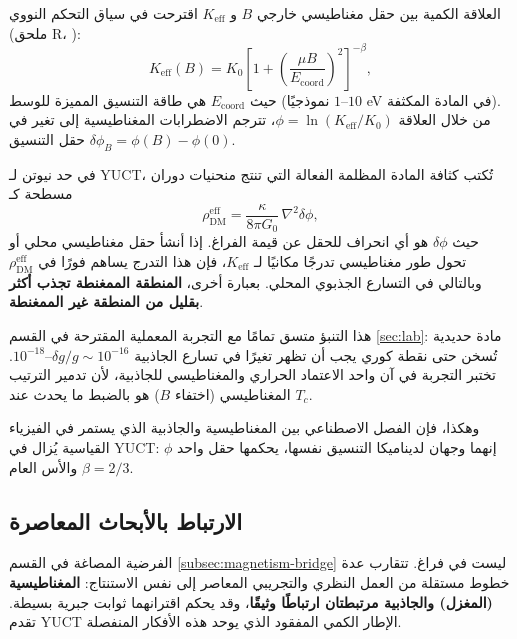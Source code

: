 \documentclass[11pt,a4paper]{article}
\newcommand{\Keff}{K_{\mathrm{eff}}}
\begin{document}
	العلاقة الكمية بين حقل مغناطيسي خارجي $B$ و $\Keff$ اقترحت في سياق التحكم النووي (ملحق R، \cite{AppendixR}):
	\begin{equation}
		\Keff(B) = K_0 \left[ 1 + \left( \frac{\mu B}{E_{\mathrm{coord}}} \right)^2 \right]^{-\beta},
		\label{eq:keff-B}
	\end{equation}
	حيث $E_{\mathrm{coord}}$ هي طاقة التنسيق المميزة للوسط (نموذجيًا $1$--$10$ eV في المادة المكثفة). من خلال العلاقة $\phi = \ln(\Keff/K_0)$، تترجم الاضطرابات المغناطيسية إلى تغير في حقل التنسيق $\delta\phi_B = \phi(B) - \phi(0)$.
	
	في حد نيوتن لـ YUCT، تُكتب كثافة المادة المظلمة الفعالة التي تنتج منحنيات دوران مسطحة كـ
	\begin{equation}
		\rho_{\mathrm{DM}}^{\mathrm{eff}} = \frac{\kappa}{8\pi G_0}\,\nabla^2\delta\phi,
		\label{eq:rho-dm}
	\end{equation}
	حيث $\delta\phi$ هو أي انحراف للحقل عن قيمة الفراغ. إذا أنشأ حقل مغناطيسي محلي أو تحول طور مغناطيسي تدرجًا مكانيًا لـ $\Keff$، فإن هذا التدرج يساهم فورًا في $\rho_{\mathrm{DM}}^{\mathrm{eff}}$ وبالتالي في التسارع الجذبوي المحلي. بعبارة أخرى، \textbf{المنطقة الممغنطة تجذب أكثر بقليل من المنطقة غير الممغنطة}.
	
	هذا التنبؤ متسق تمامًا مع التجربة المعملية المقترحة في القسم \ref{sec:lab}: مادة حديدية تُسخن حتى نقطة كوري يجب أن تظهر تغيرًا في تسارع الجاذبية $\delta g/g \sim 10^{-16}$–$10^{-18}$. تختبر التجربة في آن واحد الاعتماد الحراري والمغناطيسي للجاذبية، لأن تدمير الترتيب المغناطيسي (اختفاء $B$) هو بالضبط ما يحدث عند $T_c$.
	
	وهكذا، فإن الفصل الاصطناعي بين المغناطيسية والجاذبية الذي يستمر في الفيزياء القياسية يُزال في YUCT: إنهما وجهان لديناميكا التنسيق نفسها، يحكمها حقل واحد $\phi$ والأس العام $\beta = 2/3$.
	
	\subsection{الارتباط بالأبحاث المعاصرة}
	\label{subsec:mainstream}
	
	الفرضية المصاغة في القسم \ref{subsec:magnetism-bridge} ليست في فراغ. تتقارب عدة خطوط مستقلة من العمل النظري والتجريبي المعاصر إلى نفس الاستنتاج: \textbf{المغناطيسية (المغزل) والجاذبية مرتبطتان ارتباطًا وثيقًا}، وقد يحكم اقترانهما ثوابت جبرية بسيطة. تقدم YUCT الإطار الكمي المفقود الذي يوحد هذه الأفكار المنفصلة.
	
\end{document}
